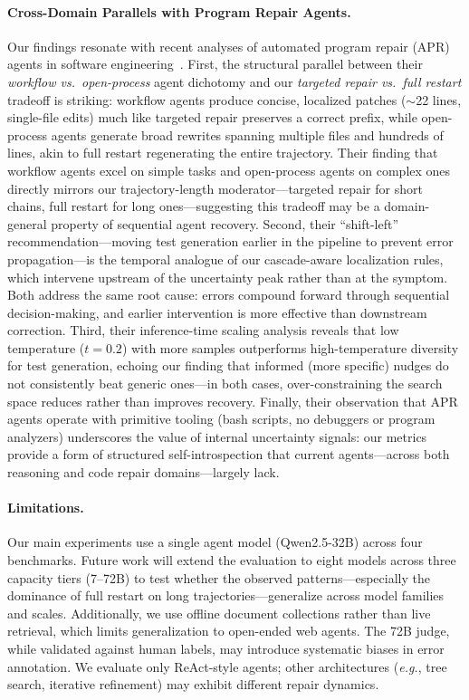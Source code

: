 \documentclass[letterpaper]{article}
\newcommand{\eg}{\textit{e.g.}}
\begin{document}
\paragraph{Cross-Domain Parallels with Program Repair Agents.}
Our findings resonate with recent analyses of automated program repair (APR) agents in software engineering~\citep{ceka2026understanding}. First, the structural parallel between their \emph{workflow vs.\ open-process} agent dichotomy and our \emph{targeted repair vs.\ full restart} tradeoff is striking: workflow agents produce concise, localized patches ($\sim$22 lines, single-file edits) much like targeted repair preserves a correct prefix, while open-process agents generate broad rewrites spanning multiple files and hundreds of lines, akin to full restart regenerating the entire trajectory. Their finding that workflow agents excel on simple tasks and open-process agents on complex ones directly mirrors our trajectory-length moderator---targeted repair for short chains, full restart for long ones---suggesting this tradeoff may be a domain-general property of sequential agent recovery.
Second, their ``shift-left'' recommendation---moving test generation earlier in the pipeline to prevent error propagation---is the temporal analogue of our cascade-aware localization rules, which intervene upstream of the uncertainty peak rather than at the symptom. Both address the same root cause: errors compound forward through sequential decision-making, and earlier intervention is more effective than downstream correction. Third, their inference-time scaling analysis reveals that low temperature ($t{=}0.2$) with more samples outperforms high-temperature diversity for test generation, echoing our finding that informed (more specific) nudges do not consistently beat generic ones---in both cases, over-constraining the search space reduces rather than improves recovery. Finally, their observation that APR agents operate with primitive tooling (bash scripts, no debuggers or program analyzers) underscores the value of internal uncertainty signals: our metrics provide a form of structured self-introspection that current agents---across both reasoning and code repair domains---largely lack.

\paragraph{Limitations.} Our main experiments use a single agent model (Qwen2.5-32B) across four benchmarks. Future work will extend the evaluation to eight models across three capacity tiers (7--72B) to test whether the observed patterns---especially the dominance of full restart on long trajectories---generalize across model families and scales. Additionally, we use offline document collections rather than live retrieval, which limits generalization to open-ended web agents. The 72B judge, while validated against human labels, may introduce systematic biases in error annotation. We evaluate only ReAct-style agents; other architectures (\eg, tree search, iterative refinement) may exhibit different repair dynamics.
\end{document}
